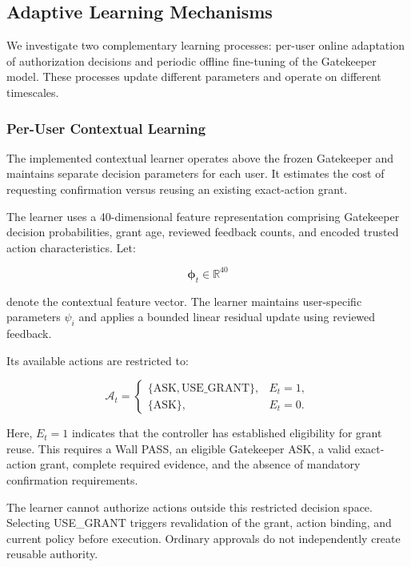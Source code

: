 \documentclass[10pt,conference]{IEEEtran}
\newcommand{\Ask}{\ensuremath{\mathrm{ASK}}}
\begin{document}
\subsection{Adaptive Learning Mechanisms}

We investigate two complementary learning processes: per-user online adaptation of authorization decisions and periodic offline fine-tuning of the Gatekeeper model. These processes update different parameters and operate on different timescales.


\subsubsection{Per-User Contextual Learning}

The implemented contextual learner operates
above the frozen Gatekeeper and maintains
separate decision parameters for each user.
It estimates the cost of requesting
confirmation versus reusing an existing
exact-action grant.

The learner uses a 40-dimensional feature
representation comprising Gatekeeper
decision probabilities, grant age,
reviewed feedback counts, and encoded
trusted action characteristics. Let:

\begin{equation}
\boldsymbol{\phi}_t \in \mathbb{R}^{40}
\end{equation}

denote the contextual feature vector.
The learner maintains user-specific
parameters $\psi_i$ and applies a bounded
linear residual update using reviewed
feedback.

Its available actions are restricted to:

\begin{equation}
\mathcal{A}_t =
\begin{cases}
\{\Ask,\mathrm{USE\_GRANT}\}, & E_t=1,\\
\{\Ask\}, & E_t=0.
\end{cases}
\label{eq:bandit_actions}
\end{equation}

Here, $E_t=1$ indicates that the controller
has established eligibility for grant reuse.
This requires a Wall PASS, an eligible
Gatekeeper ASK, a valid exact-action grant,
complete required evidence, and the absence
of mandatory confirmation requirements.

The learner cannot authorize actions outside
this restricted decision space. Selecting
USE\_GRANT triggers revalidation of the
grant, action binding, and current policy
before execution. Ordinary approvals do
not independently create reusable authority.
\end{document}
